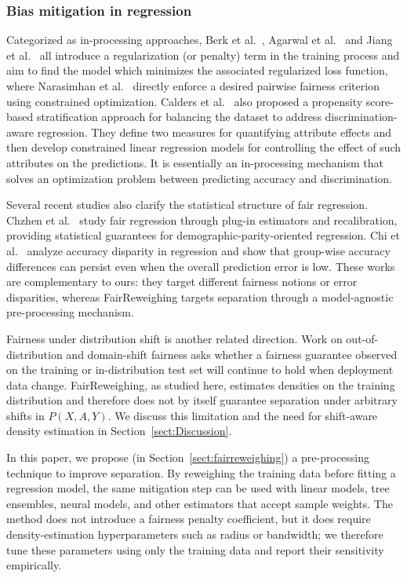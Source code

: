 \subsubsection{Bias mitigation in regression}

Categorized as in-processing approaches, Berk et al.~\cite{berk2017convex}, Agarwal et al.~\cite{agarwal2019fair} and Jiang et al.~\cite{jiang2022generalized} all introduce a regularization (or penalty) term in the training process and aim to find the model which minimizes the associated regularized loss function, where Narasimhan et al.~\cite{narasimhan2020pairwise} directly enforce a desired pairwise fairness criterion using constrained optimization. Calders et al.~\cite{calders2013controlling} also proposed a propensity score-based stratification approach for balancing the dataset to address discrimination-aware regression. They define two measures for quantifying attribute effects and then develop constrained linear regression models for controlling the effect of such attributes on the predictions. It is essentially an in-processing mechanism that solves an optimization problem between predicting accuracy and discrimination.

Several recent studies also clarify the statistical structure of fair regression. Chzhen et al.~\cite{chzhen2020fair} study fair regression through plug-in estimators and recalibration, providing statistical guarantees for demographic-parity-oriented regression. Chi et al.~\cite{chi2021understanding} analyze accuracy disparity in regression and show that group-wise accuracy differences can persist even when the overall prediction error is low. These works are complementary to ours: they target different fairness notions or error disparities, whereas FairReweighing targets separation through a model-agnostic pre-processing mechanism.

Fairness under distribution shift is another related direction. Work on out-of-distribution and domain-shift fairness asks whether a fairness guarantee observed on the training or in-distribution test set will continue to hold when deployment data change. FairReweighing, as studied here, estimates densities on the training distribution and therefore does not by itself guarantee separation under arbitrary shifts in $P(X,A,Y)$. We discuss this limitation and the need for shift-aware density estimation in Section~\ref{sect:Discussion}.

In this paper, we propose (in Section~\ref{sect:fairreweighing}) a pre-processing technique to improve separation. By reweighing the training data before fitting a regression model, the same mitigation step can be used with linear models, tree ensembles, neural models, and other estimators that accept sample weights. The method does not introduce a fairness penalty coefficient, but it does require density-estimation hyperparameters such as radius or bandwidth; we therefore tune these parameters using only the training data and report their sensitivity empirically.


